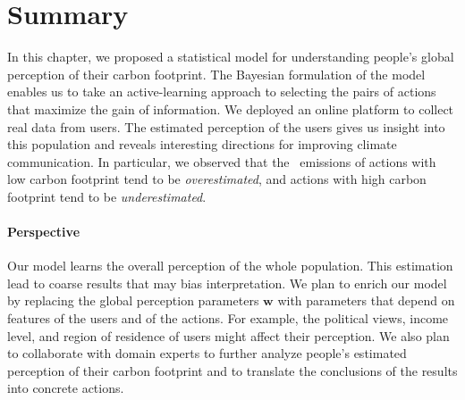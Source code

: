 \section{Summary}
\label{clm:sec:conclusion}

In this chapter, we proposed a statistical model for understanding people's global perception of their carbon footprint.
The Bayesian formulation of the model enables us to take an active-learning approach to selecting the pairs of actions that maximize the gain of information.
We deployed an online platform to collect real data from users.
The estimated perception of the users gives us insight into this population and reveals interesting directions for improving climate communication.
In particular, we observed that the \COtwo\ emissions of actions with low carbon footprint tend to be \textit{overestimated}, and actions with high carbon footprint tend to be \textit{underestimated}.

\paragraph{Perspective}
Our model learns the overall perception of the whole population.
This estimation lead to coarse results that may bias interpretation.
We plan to enrich our model by replacing the global perception parameters $\bm{w}$ with parameters that depend on features of the users and of the actions.
For example, the political views, income level, and region of residence of users might affect their perception.
We also plan to collaborate with domain experts to further analyze people's estimated perception of their carbon footprint and to translate the conclusions of the results into concrete actions.
